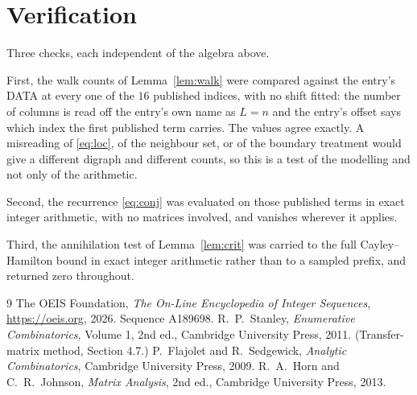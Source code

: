 \documentclass[11pt,a4paper]{article}
\theoremstyle{plain}
\theoremstyle{definition}
\begin{document}
\section{Verification}

Three checks, each independent of the algebra above.

First, the walk counts of Lemma~\ref{lem:walk} were compared against the entry's DATA at
every one of the $16$ published indices, with no shift fitted: the number of columns is
read off the entry's own name as $L=n$ and the entry's offset says which index the first
published term carries. The values agree exactly. A misreading of \eqref{eq:loc}, of the
neighbour set, or of the boundary treatment would give a different digraph and different
counts, so this is a test of the modelling and not only of the arithmetic.

Second, the recurrence \eqref{eq:conj} was evaluated on those published terms in exact
integer arithmetic, with no matrices involved, and vanishes wherever it applies.

Third, the annihilation test of Lemma~\ref{lem:crit} was carried to the full
Cayley--Hamilton bound in exact integer arithmetic rather than to a sampled prefix, and
returned zero throughout.

\begin{thebibliography}{9}
 The OEIS Foundation, \emph{The On-Line Encyclopedia of Integer
Sequences}, \url{https://oeis.org}, 2026. Sequence A189698.
 R.~P.~Stanley, \emph{Enumerative Combinatorics}, Volume 1, 2nd ed.,
Cambridge University Press, 2011. (Transfer-matrix method, Section 4.7.)
 P.~Flajolet and R.~Sedgewick, \emph{Analytic Combinatorics}, Cambridge
University Press, 2009.
 R.~A.~Horn and C.~R.~Johnson, \emph{Matrix Analysis}, 2nd ed., Cambridge
University Press, 2013.
\end{thebibliography}
\end{document}
